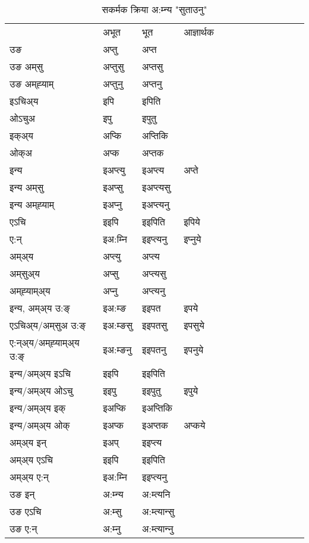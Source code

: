 \begin{table}[H]
\centering
\caption{\label{ipt.vt} सकर्मक क्रिया  अ:म्‍न्य  "सुताउनु"  }
\begin{tabular}{l|l|l|l|l|l|l|l|l|l|l|l|l}  \toprule
&अभूत & भूत & आज्ञार्थक \\ 
उङ &अप्‍तु &अप्‍त \\ 
उङ अम्‌सु&अप्‍तुसु &अप्‍तसु \\ 
उङ अम्‌ह्‍याम्&अप्‍तुनु &अप्‍तनु \\ 
इऽचिअ्य &इपि &इपिति   \\ 
ओऽचुअ        &इपु &इपुतु   \\ 
इक्अ्य&अप्कि &अप्‍तिकि   \\ 
ओक्अ &अप्क &अप्‍तक   \\ 
इन्य & इअप्‍त्यु  & इअप्‍त्य &अप्‍ते  \\ 
इन्य अम्‌सु& इअप्सु  & इअप्‍त्यसु   \\ 
इन्य अम्‌ह्‍याम्& इअप्‍नु  & इअप्‍त्यनु   \\ 
एऽचि & इइपि & इइपिति &इपिये    \\ 
ए:न् & इअ:म्‍नि  & इइप्‍त्यनु &इप्‍नुये  \\ 
अम्अ्य & अप्‍त्यु  & अप्‍त्य  \\ 
अम्‌सुअ्य & अप्सु & अप्‍त्यसु  \\ 
अम्‌ह्‍याम्अ्य & अप्‍नु  & अप्‍त्यनु \\ 
\midrule
इन्य, अम्अ्य उ:ङ्‌ &इअ:म्ङ &इइपत &इपये \\ 
एऽचिअ्य/अम्‌सुअ उ:ङ्‌ &इअ:म्ङसु &इइपतसु &इपसुये \\ 
ए:न्अ्य/अम्‌ह्‍याम्अ्य उ:ङ्‌ &इअ:म्ङनु &इइपतनु &इपनुये \\ 
इन्य/अम्अ्य इऽचि &इइपि &इइपिति    \\ 
इन्य/अम्अ्य ओऽचु &इइपु &इइपुतु  &इपुये  \\ 
इन्य/अम्अ्य इक् &इअप्कि &इअप्‍तिकि   \\ 
इन्य/अम्अ्य ओक् &इअप्क &इअप्‍तक  &अप्कये  \\ 
अम्अ्य इन् & इअप् & इइप्‍त्य   \\ 
अम्अ्य एऽचि & इइपि & इइपिति    \\ 
अम्अ्य ए:न् & इअ:म्‍नि  & इइप्‍त्यनु  \\ 
\midrule
उङ इन् & अ:म्‍न्य  & अ:म्त्यनि  \\ 
उङ एऽचि & अ:म्सु  & अ:म्त्यान्सु   \\ 
उङ ए:न्& अ:म्‍नु  & अ:म्त्यान्‍नु   \\ 
\bottomrule
\end{tabular}
\end{table}


